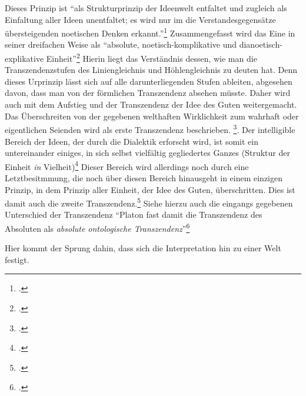 Dieses Prinzip ist \enquote{als Strukturprinzip der Ideenwelt entfaltet und zugleich als Einfaltung aller Ideen unentfaltet; es wird nur im die Verstandesgegensätze übersteigenden noetischen Denken erkannt.}\footcite[vgl.][S. 190]{halfwassenaufstieg2006}
Zusammengefasst wird das Eine in seiner dreifachen Weise als \enquote{absolute, noetisch-komplikative und dianoetisch-explikative Einheit}\footcite[][S. 190]{halfwassenaufstieg2006}
Hierin liegt das Verständnis dessen, wie man die Transzendenzstufen des Liniengleichnis und Höhlengleichnis zu deuten hat. Denn dieses Urprinzip lässt sich auf alle darunterliegenden Stufen ableiten, abgesehen davon, dass man von der förmlichen Transzendenz absehen müsste. 
Daher wird auch mit dem Aufstieg und der Transzendenz der Idee des Guten weitergemacht.
Das Überschreiten von der gegebenen welthaften Wirklichkeit zum wahrhaft oder eigentlichen Seienden wird als erste Transzendenz beschrieben. \footcite[vgl.][S. 222]{halfwassenaufstieg2006}.
Der intelligible Bereich der Ideen, der durch die Dialektik erforscht wird, ist somit ein untereinander einiges, in sich selbst vielfältig gegliedertes Ganzes (Struktur der Einheit \emph{in} Vielheit)\footcite[vgl.][S. 223]{halfwassenaufstieg2006} Dieser Bereich wird allerdings noch durch eine Letztbesitmmung, die noch über diesen Bereich hinausgeht in einem einzigen Prinzip, in dem Prinzip aller Einheit, der Idee des Guten, überschritten. Dies ist damit auch die zweite Transzendenz.\footcite[vgl.][S. 223f.]{halfwassenaufstieg2006}
Siehe hierzu auch die eingangs gegebenen Unterschied der Transzendenz
\enquote{Platon fast damit die Transzendenz des Absoluten als \emph{absolute ontologische Transzendenz}}\footcite[][S. 224]{halfwassenaufstieg2006}

Hier kommt der Sprung dahin, dass sich die Interpretation hin zu einer Welt festigt. 

